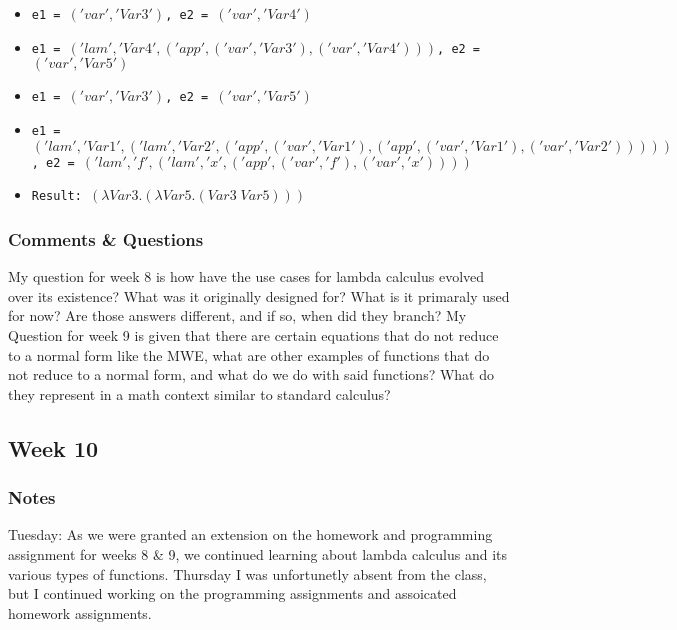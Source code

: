 \documentclass{article}
\theoremstyle{theorem}
\theoremstyle{definition}
\theoremstyle{remark}
\begin{document}
\begin{itemize}
\begin{itemize}
        \item \texttt{e1 = $('var', 'Var3')$, e2 = $('var', 'Var4')$}
        \item \texttt{e1 = $('lam', 'Var4', ('app', ('var', 'Var3'), ('var', 'Var4')))$, e2 = $('var', 'Var5')$}
        \item \texttt{e1 = $('var', 'Var3')$, e2 = $('var', 'Var5')$}
        \item \texttt{e1 = $('lam', 'Var1', ('lam', 'Var2', ('app', ('var', 'Var1'), ('app', ('var', 'Var1'), ('var', 'Var2')))))$, \newline e2 = $('lam', 'f', ('lam', 'x', ('app', ('var', 'f'), ('var', 'x'))))$}
        \item \texttt{Result: $(\lambda Var3.(\lambda Var5.(Var3\; Var5)))$}
        \end{itemize}
\end{itemize}

\subsubsection{Comments \& Questions}
My question for week 8 is how have the use cases for lambda calculus evolved over its existence? What was it originally designed for? What is it primaraly used for now? Are those answers different, and if so, when did they branch?
\newline \newline My Question for week 9 is given that there are certain equations that do not reduce to a normal form like the MWE, what are other examples of functions that do not reduce to a normal form, and what do we do with said functions? What do they represent in a math context similar to standard calculus?

\subsection{Week 10}

\subsubsection{Notes}
Tuesday: As we were granted an extension on the homework and programming assignment for weeks 8 \& 9, we continued learning about lambda calculus and its various types of functions. \newline Thursday I was unfortunetly absent from the class, but I continued working on the programming assignments and assoicated homework assignments. 
\end{document}
